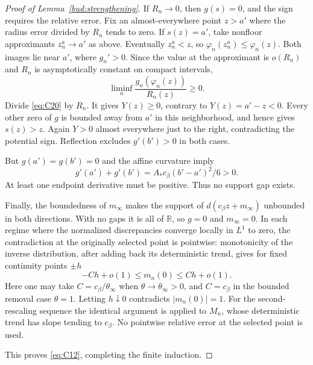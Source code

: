 \begin{proof}[Proof of Lemma~\ref{bud:strengthening}]
If \(R_n\to0\), then \(g(s)=0\), and the sign requires the
relative error. Fix an almost-everywhere point \(z>a'\) where the
radius error divided by \(R_n\) tends to zero. If \(s(z)=a'\),
take nonfloor approximants \(z_n^a\to a'\) as above. Eventually
\(z_n^a<z\), so \(\varphi_n(z_n^a)\le\varphi_n(z)\).
Both images lie near \(a'\), where \(g_n'>0\). Since the value at
the approximant is \(o(R_n)\) and \(R_n\) is asymptotically
constant on compact intervals,
\[
 \liminf_n\frac{g_n(\varphi_n(z))}{R_n(z)}\ge0.
\]
Divide \eqref{eq:C20} by \(R_n\). It gives \(Y(z)\ge0\),
contrary to \(Y(z)=a'-z<0\). Every other zero of \(g\) is
bounded away from \(a'\) in this neighborhood, and hence gives
\(s(z)>z\). Again \(Y>0\) almost everywhere just to the right,
contradicting the potential sign. Reflection excludes
\(g'(b')>0\) in both cases.

But \(g(a')=g(b')=0\) and the affine curvature imply
\[
 g'(a')+g'(b')=A_*c_\beta(b'-a')^2/6>0.
\]
At least one endpoint derivative must be positive. Thus no support gap
exists.

Finally, the boundedness of \(m_\infty\) makes the support of
\(d(c_\beta z+m_\infty)\) unbounded in both directions.  With no gaps
it is all of \(\mathbb R\), so \(g=0\) and \(m_\infty=0\).
In each regime where the normalized discrepancies converge locally in
\(L^1\) to zero, the contradiction at the originally selected point is
pointwise: monotonicity of the inverse distribution, after adding back
its deterministic trend, gives for fixed continuity points \(\pm h\)
\[
 -C h+o(1)\le m_n(0)\le C h+o(1).
\]
Here one may take \(C=c_\beta/\theta_\infty\) when
\(\theta\to\theta_\infty>0\), and \(C=c_\beta\) in the bounded
removal case \(\theta=1\).
Letting \(h\downarrow0\) contradicts \(|m_n(0)|=1\).
For the second-rescaling sequence the identical argument is applied to
\(M_n\), whose deterministic trend has slope tending to \(c_\beta\).
No pointwise relative error at the selected point is used.


This proves \eqref{eq:C12}, completing the finite induction. \end{proof}

